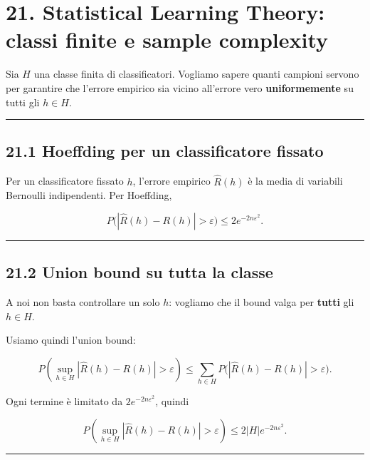 \documentclass[
]{article}
\begin{document}
\section{21. Statistical Learning Theory: classi finite e sample
complexity}\label{statistical-learning-theory-classi-finite-e-sample-complexity}

Sia \(H\) una classe finita di classificatori. Vogliamo sapere quanti
campioni servono per garantire che l'errore empirico sia vicino
all'errore vero \textbf{uniformemente} su tutti gli \(h\in H\).

\begin{center}\rule{0.5\linewidth}{0.5pt}\end{center}

\subsection{21.1 Hoeffding per un classificatore
fissato}\label{hoeffding-per-un-classificatore-fissato}

Per un classificatore fissato \(h\), l'errore empirico \(\hat R(h)\) è
la media di variabili Bernoulli indipendenti. Per Hoeffding,

\[
P\big(|\hat R(h)-R(h)|>\varepsilon\big)
\le
2e^{-2n\varepsilon^2}.
\]

\begin{center}\rule{0.5\linewidth}{0.5pt}\end{center}

\subsection{21.2 Union bound su tutta la
classe}\label{union-bound-su-tutta-la-classe}

A noi non basta controllare un solo \(h\): vogliamo che il bound valga
per \textbf{tutti} gli \(h\in H\).

Usiamo quindi l'union bound:

\[
P\left(\sup_{h\in H}|\hat R(h)-R(h)|>\varepsilon\right)
\le
\sum_{h\in H} P\big(|\hat R(h)-R(h)|>\varepsilon\big).
\]

Ogni termine è limitato da \(2e^{-2n\varepsilon^2}\), quindi

\[
P\left(\sup_{h\in H}|\hat R(h)-R(h)|>\varepsilon\right)
\le
2|H|e^{-2n\varepsilon^2}.
\]

\begin{center}\rule{0.5\linewidth}{0.5pt}\end{center}
\end{document}
